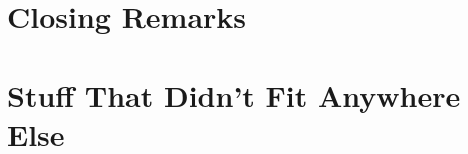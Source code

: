 \documentclass[a4paper,oneside,11pt]{book}
\begin{document}




\chapter{Closing Remarks}



\appendix
\chapter{Stuff That Didn't Fit Anywhere Else}



\end{document}
